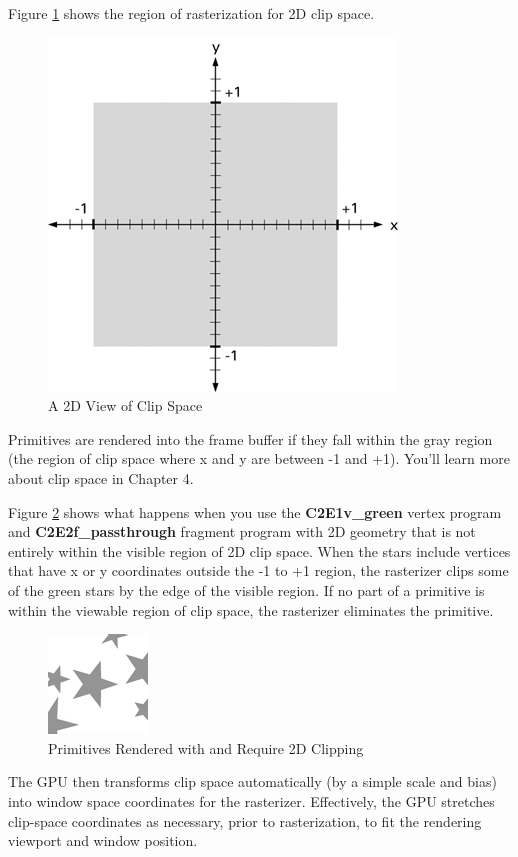 \documentclass{book}
\begin{document}
Figure \ref{fig:2-6} shows the region of rasterization for 2D clip space.

\begin{figure}
    \centering
    \includegraphics[width=0.5\linewidth]{Images/fig2_6.jpg}
    \caption{A 2D View of Clip Space}
    \label{fig:2-6}
\end{figure}

Primitives are rendered into the frame buffer if they fall within the gray region (the region of clip space where x and y are between -1 and +1). You'll learn more about clip space in Chapter 4.

Figure \ref{fig:2-7} shows what happens when you use the \textbf{C2E1v_green} vertex program and \textbf{C2E2f_passthrough} fragment program with 2D geometry that is not entirely within the visible region of 2D clip space. When the stars include vertices that have x or y coordinates outside the -1 to +1 region, the rasterizer clips some of the green stars by the edge of the visible region. If no part of a primitive is within the viewable region of clip space, the rasterizer eliminates the primitive.

\begin{figure}
    \centering
    \includegraphics[width=0.25\linewidth]{Images/fig_0008.jpg}
    \caption{Primitives Rendered with and Require 2D Clipping}
    \label{fig:2-7}
\end{figure}

The GPU then transforms clip space automatically (by a simple scale and bias) into window space coordinates for the rasterizer. Effectively, the GPU stretches clip-space coordinates as necessary, prior to rasterization, to fit the rendering viewport and window position.
\end{document}
